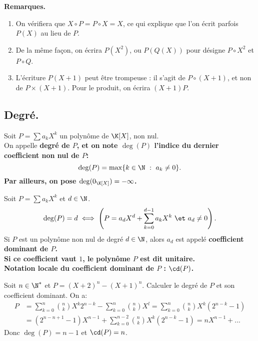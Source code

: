 \documentclass[11pt]{article}
\begin{document}
\bf{Remarques.}
\begin{enumerate}
    \item On vérifiera que $X\circ P=P\circ X=X$, ce qui explique que l'on écrit parfois $P(X)$ au lieu de $P$.
    \item De la même façon, on écrira $P(X^2)$, ou $P(Q(X))$ pour désigne $P\circ X^2$ et $P\circ Q$.
    \item L'écriture $P(X+1)$ peut être trompeuse : il s'agit de $P\circ(X+1)$, et non de $P\times(X+1)$. Pour le produit, on écrira $(X+1)P$.
\end{enumerate}

\subsection{Degré.}

\begin{defi}{}{}
    Soit $P=\sum a_kX^k$ un polynôme de $\K[X]$, non nul.\\
    On appelle \bf{degré} de $P$, et on note $\deg(P)$ l'indice du dernier coefficient non nul de $P$:
    \begin{equation*}
        \deg(P)=\max\{k\in\N ~:~ a_k\neq0\}.
    \end{equation*}
    Par ailleurs, on pose $\deg(0_{\K[X]})=-\infty$.
\end{defi}

\begin{defi}{}{}
    Soit $P=\sum a_kX^k$ et $d\in\N$.
    \begin{equation*}
        \deg(P)=d \iff \left( P=a_dX^d + \sum_{k=0}^{d-1}a_kX^k ~\et~ a_d \neq 0 \right).
    \end{equation*}
    Si $P$ est un polynôme non nul de degré $d\in\N$, alors $a_d$ est appelé \bf{coefficient dominant} de $P$.\\
    Si ce coefficient vaut $1$, le polynôme $P$ est dit \bf{unitaire.}\\
    Notation locale du coefficient dominant de $P$ : $\cd(P)$.
\end{defi}

\pagebreak

\begin{ex}{}{}
    Soit $n\in\N^*$ et $P=(X+2)^n-(X+1)^n$. Calculer le degré de $P$ et son coefficient dominant.
    \tcblower
    On a:
    \begin{align*}
        P&=\sum_{k=0}^n\binom{n}{k}X^k2^{n-k} - \sum_{k=0}^n\binom{n}{k}X^l=\sum_{k=0}^n\binom{n}{k}X^k(2^{n-k}-1)\\
        &=(2^{n-n+1}-1)X^{n-1}+\sum_{k=0}^{n-2}\binom{n}{k}X^k(2^{n-k}-1)=nX^{n-1}+...
    \end{align*}
    Donc $\deg(P)=n-1$ et $\cd(P)=n$.
\end{ex}
\end{document}
